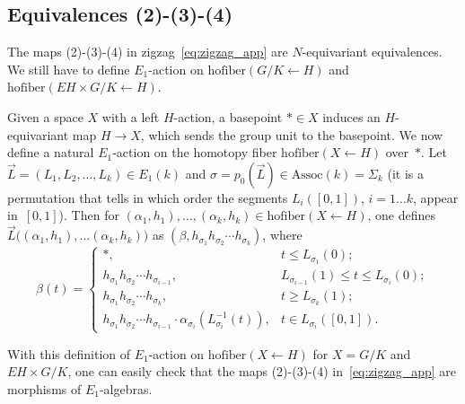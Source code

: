 \documentclass[11pt]{amsart}
\theoremstyle{definition}
\newcommand{\hofiber}{\mathrm{hofiber}}
\newcommand{\Assoc}{\mathrm{Assoc}}
\numberwithin{equation}{section}
\begin{document}
\subsection{Equivalences (2)-(3)-(4)}\label{ss:a2}
The maps (2)-(3)-(4) %
 in  zigzag~\eqref{eq:zigzag_app} are  $N$-equivariant equivalences. We still have to define $E_1$-action on 
$\hofiber\left( G/K\leftarrow H\right)$ and $\hofiber\left(EH\times G/K\leftarrow H\right)$.

Given a space $X$ with a left $H$-action, a basepoint $*\in X$ induces an $H$-equivariant map $H\to X$, which sends
the group unit to the basepoint. We now define a natural $E_1$-action on the homotopy fiber $\hofiber(X\leftarrow H)$
over~$*$. Let $\vec L=(L_1,L_2,\ldots,L_k)\in E_1(k)$ and $\sigma=p_0(\vec L)\in \Assoc(k)=\Sigma_k$ (it is a permutation that
tells in which order the segments $L_i([0,1])$, $i=1\ldots k$, appear in~$[0,1]$). 
Then for $(\alpha_1,h_1),\ldots,(\alpha_k,h_k)\in \hofiber(X\leftarrow H)$, one defines $\vec L\bigl((\alpha_1,h_1),\ldots
(\alpha_k,h_k)\bigr)$ as $(\beta,h_{\sigma_1}h_{\sigma_2}\cdots h_{\sigma_k})$, where 
\[
\beta(t)=
\begin{cases}
*,& t\leq L_{\sigma_1}(0);\\
h_{\sigma_1}h_{\sigma_2}\cdots h_{\sigma_{i-1}},& L_{\sigma_{i-1}}(1)\leq t\leq L_{\sigma_i}(0);\\
h_{\sigma_1}h_{\sigma_2}\cdots h_{\sigma_k},& t\geq L_{\sigma_k}(1);\\
h_{\sigma_1}h_{\sigma_2}\cdots h_{\sigma_{i-1}}\cdot\alpha_{\sigma_i}(L_{\sigma_i}^{-1}(t)),& t\in L_{\sigma_i}([0,1]).
\end{cases}
\]

With this definition of $E_1$-action on $\hofiber(X\leftarrow H)$ for $X=G/K$ and~$EH\times G/K$, one can easily check that the maps
(2)-(3)-(4) in~\eqref{eq:zigzag_app} are morphisms of $E_1$-algebras.
\end{document}
